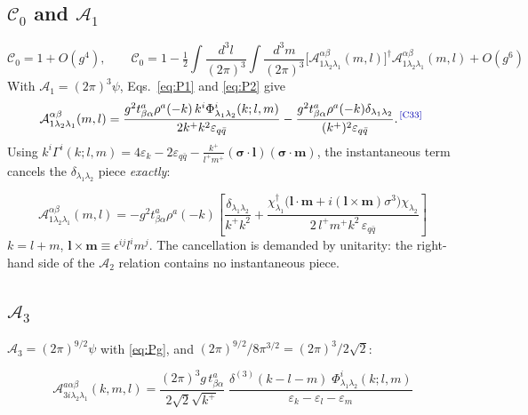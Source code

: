 \documentclass[11pt]{article}
\newcommand{\eps}{\varepsilon}
\newcommand{\dg}{\dagger}
\newcommand{\ip}[1]{\int\!\frac{d^{3}#1}{(2\pi)^{3}}}
\newcommand{\dthree}{\delta^{(3)}}
\newcommand{\half}{\tfrac12}
\newcommand{\Gam}{\Gamma}
\newcommand{\Ph}{\Phi}
\newcommand{\A}{\mathcal{A}}
\newcommand{\C}{\mathcal{C}}
\newcommand{\chg}[1]{{\color{blue!70!black}\textsuperscript{\,[C#1]}}}
\begin{document}
\subsection{$\C_{0}$ and $\A_{1}$}
\begin{equation}
\C_{0}=1+O(g^{4}),\qquad
\C_{0}=1-\half\ip{l}\ip{m}\big[\A^{\alpha\beta}_{1\lambda_{2}\lambda_{1}}(m,l)\big]^{\dg}
\A^{\alpha\beta}_{1\lambda_{2}\lambda_{1}}(m,l)+O(g^{6})
\end{equation}
With $\A_{1}=(2\pi)^{3}\psi$, Eqs.~\eqref{eq:P1} and \eqref{eq:P2} give
\begin{equation}
\A^{\alpha\beta}_{1\lambda_{2}\lambda_{1}}(m,l)=
\frac{g^{2}t^{a}_{\beta\alpha}\rho^{a}(-k)\,k^{i}\Ph^{i}_{\lambda_{1}\lambda_{2}}(k;l,m)}
{2k^{+}k^{2}\eps_{q\bar q}}
-\frac{g^{2}t^{a}_{\beta\alpha}\rho^{a}(-k)\delta_{\lambda_{1}\lambda_{2}}}
{(k^{+})^{2}\eps_{q\bar q}} .\chg{33}
\end{equation}
Using $k^{i}\Gam^{i}(k;l,m)=4\eps_{k}-2\eps_{q\bar q}
-\tfrac{k^{+}}{l^{+}m^{+}}(\bm\sigma\!\cdot\!\bm l)(\bm\sigma\!\cdot\!\bm m)$, the instantaneous
term cancels the $\delta_{\lambda_{1}\lambda_{2}}$ piece \emph{exactly}:
\begin{res}
\begin{equation}
\boxed{\;
\A^{\alpha\beta}_{1\lambda_{2}\lambda_{1}}(m,l)=
-g^{2}t^{a}_{\beta\alpha}\rho^{a}(-k)\left[
\frac{\delta_{\lambda_{1}\lambda_{2}}}{k^{+}k^{2}}
+\frac{\chi^{\dg}_{\lambda_{1}}\big(\bm l\!\cdot\!\bm m+i(\bm l\!\times\!\bm m)\sigma^{3}\big)
\chi_{\lambda_{2}}}{2\,l^{+}m^{+}k^{2}\,\eps_{q\bar q}}\right]}
\label{eq:A1}
\end{equation}
$k=l+m$, $\bm l\!\times\!\bm m\equiv\epsilon^{ij}l^{i}m^{j}$. The cancellation is demanded by
unitarity: the right-hand side of the $\A_{2}$ relation contains no instantaneous piece.
\end{res}

\subsection{$\A_{3}$}
$\A_{3}=(2\pi)^{9/2}\psi$ with \eqref{eq:Pg}, and $(2\pi)^{9/2}/8\pi^{3/2}=(2\pi)^{3}/2\sqrt2$:
\begin{res}
\begin{equation}
\boxed{\;
\A^{a\alpha\beta}_{3i\lambda_{2}\lambda_{1}}(k,m,l)=
\frac{(2\pi)^{3}g\,t^{a}_{\beta\alpha}}{2\sqrt2\sqrt{k^{+}}}\;
\frac{\dthree(k-l-m)\;\Ph^{i}_{\lambda_{1}\lambda_{2}}(k;l,m)}{\eps_{k}-\eps_{l}-\eps_{m}}}
\label{eq:A3}
\end{equation}
\end{res}
\end{document}
